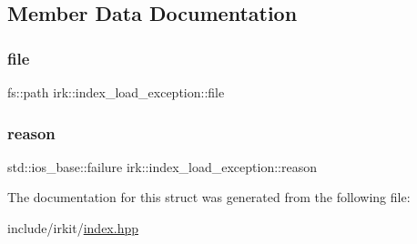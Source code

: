 \subsection{Member Data Documentation}
\mbox{\label{structirk_1_1index__load__exception_a38c51abcb6c272187ba08e0c9ad7f674}} 
\subsubsection{\texorpdfstring{file}{file}}
{\footnotesize\ttfamily fs\+::path irk\+::index\+\_\+load\+\_\+exception\+::file}

\mbox{\label{structirk_1_1index__load__exception_aa175d8f2c63df9d2451e57830e2e2467}} 
\subsubsection{\texorpdfstring{reason}{reason}}
{\footnotesize\ttfamily std\+::ios\+\_\+base\+::failure irk\+::index\+\_\+load\+\_\+exception\+::reason}



The documentation for this struct was generated from the following file\+:\begin{DoxyCompactItemize}
\item 
include/irkit/\mbox{\hyperlink{irkit_2index_8hpp}{index.\+hpp}}\end{DoxyCompactItemize}

